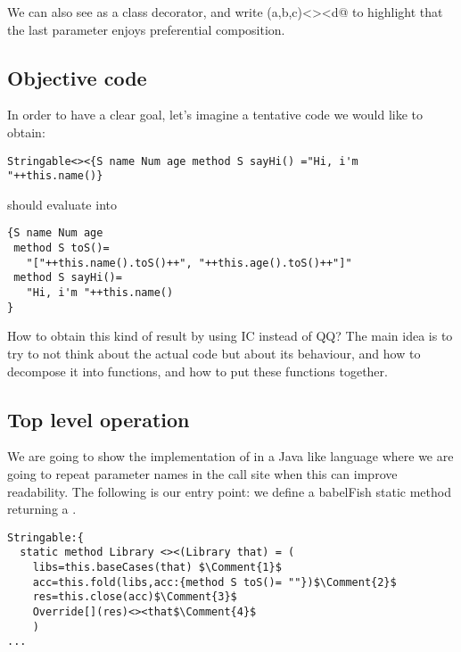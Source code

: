 We can also see \Q@Override@ as a class decorator, and
write \Q@Override(a,b,c)<><d@ to highlight that the last parameter enjoys preferential composition.

\subsection*{Objective code}
In order to have a clear goal,
let's imagine a tentative code we would like to obtain:

\begin{lstlisting}
Stringable<><{S name Num age method S sayHi() ="Hi, i'm "++this.name()}
\end{lstlisting}

\noindent should evaluate into

\begin{lstlisting}
{S name Num age
 method S toS()=
   "["++this.name().toS()++", "++this.age().toS()++"]"
 method S sayHi()=
   "Hi, i'm "++this.name()
}
\end{lstlisting}

How to obtain this kind of result by using IC instead of QQ?
The main idea is to try to not think about the actual code but about
its behaviour, and how to decompose it into functions, and how to
put these functions together.



\subsection*{Top level operation}
We are going to show the implementation of \Q@Stringable@ in a Java like language where
we are going to repeat parameter names in the call site when this can improve readability.
The following is our entry point: we define a babelFish static method
returning a \Q@Library@.

\begin{lstlisting}
Stringable:{
  static method Library <><(Library that) = (
    libs=this.baseCases(that) $\Comment{1}$
    acc=this.fold(libs,acc:{method S toS()= ""})$\Comment{2}$
    res=this.close(acc)$\Comment{3}$
    Override[](res)<><that$\Comment{4}$
    )
...
\end{lstlisting}



